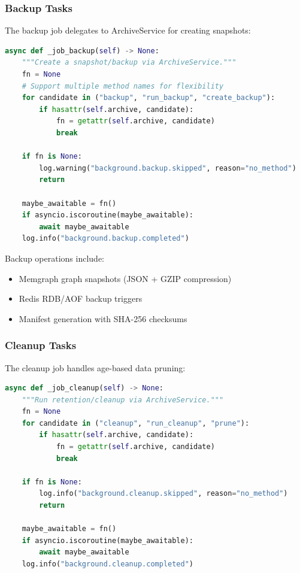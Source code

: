 \subsubsection{Backup Tasks}

The backup job delegates to ArchiveService for creating snapshots:

\begin{lstlisting}[language=Python, caption={Backup background task.}]
async def _job_backup(self) -> None:
    """Create a snapshot/backup via ArchiveService."""
    fn = None
    # Support multiple method names for flexibility
    for candidate in ("backup", "run_backup", "create_backup"):
        if hasattr(self.archive, candidate):
            fn = getattr(self.archive, candidate)
            break
    
    if fn is None:
        log.warning("background.backup.skipped", reason="no_method")
        return

    maybe_awaitable = fn()
    if asyncio.iscoroutine(maybe_awaitable):
        await maybe_awaitable
    log.info("background.backup.completed")
\end{lstlisting}

Backup operations include:
\begin{itemize}
    \item Memgraph graph snapshots (JSON + GZIP compression)
    \item Redis RDB/AOF backup triggers
    \item Manifest generation with SHA-256 checksums
\end{itemize}

\subsubsection{Cleanup Tasks}

The cleanup job handles age-based data pruning:

\begin{lstlisting}[language=Python, caption={Cleanup background task.}]
async def _job_cleanup(self) -> None:
    """Run retention/cleanup via ArchiveService."""
    fn = None
    for candidate in ("cleanup", "run_cleanup", "prune"):
        if hasattr(self.archive, candidate):
            fn = getattr(self.archive, candidate)
            break
    
    if fn is None:
        log.info("background.cleanup.skipped", reason="no_method")
        return

    maybe_awaitable = fn()
    if asyncio.iscoroutine(maybe_awaitable):
        await maybe_awaitable
    log.info("background.cleanup.completed")
\end{lstlisting}

